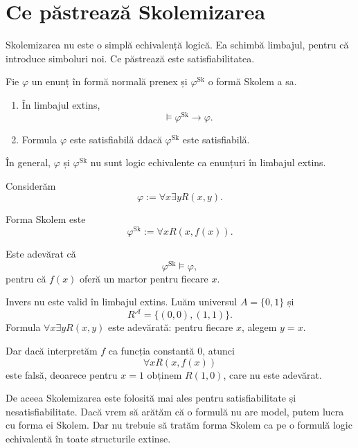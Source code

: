 \section{Ce păstrează Skolemizarea}

Skolemizarea nu este o simplă echivalență logică. Ea schimbă limbajul, pentru că introduce simboluri noi. Ce păstrează este satisfiabilitatea.

\begin{theorem}
	Fie \( \varphi \) un enunț în formă normală prenex și \( \varphi^{\mathrm{Sk}} \) o formă Skolem a sa.

	\begin{enumerate}
		\item În limbajul extins,
		      \[
			      \models \varphi^{\mathrm{Sk}} \to \varphi.
		      \]
		\item Formula \( \varphi \) este satisfiabilă ddacă \( \varphi^{\mathrm{Sk}} \) este satisfiabilă.
	\end{enumerate}
\end{theorem}

\begin{note}
	În general, \( \varphi \) și \( \varphi^{\mathrm{Sk}} \) nu sunt logic echivalente ca enunțuri în limbajul extins.
\end{note}

\begin{eg}
	Considerăm
	\[
		\varphi := \forall x\exists y R(x,y).
	\]

	Forma Skolem este
	\[
		\varphi^{\mathrm{Sk}} := \forall x R(x,f(x)).
	\]

	Este adevărat că
	\[
		\varphi^{\mathrm{Sk}} \models \varphi,
	\]
	pentru că \(f(x)\) oferă un martor pentru fiecare \(x\).

	Invers nu este valid în limbajul extins. Luăm universul \(A=\{0,1\}\) și
	\[
		R^\mathcal{A}=\{(0,0),(1,1)\}.
	\]
	Formula \( \forall x\exists y R(x,y) \) este adevărată: pentru fiecare \(x\), alegem \(y=x\).

	Dar dacă interpretăm \(f\) ca funcția constantă \(0\), atunci
	\[
		\forall xR(x,f(x))
	\]
	este falsă, deoarece pentru \(x=1\) obținem \(R(1,0)\), care nu este adevărat.
\end{eg}

\begin{note}
	De aceea Skolemizarea este folosită mai ales pentru satisfiabilitate și nesatisfiabilitate. Dacă vrem să arătăm că o formulă nu are model, putem lucra cu forma ei Skolem. Dar nu trebuie să tratăm forma Skolem ca pe o formulă logic echivalentă în toate structurile extinse.
\end{note}

